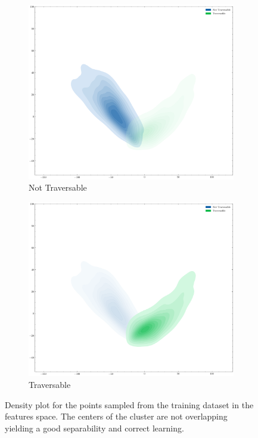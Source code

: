 \documentclass[../document.tex]{subfiles}
\begin{document}
\begin{figure} [htbp]
    \begin{subfigure}[b]{0.48\textwidth}
        \includegraphics[width=\linewidth]{../img/5/pca/pca-0-density.png}
        \caption{Not Traversable}
    \end{subfigure}
    \begin{subfigure}[b]{0.48\textwidth}
        \includegraphics[width=\linewidth]{../img/5/pca/pca-1-density.png}
        \caption{Traversable}
    \end{subfigure}
    \caption{Density plot for the points sampled from the training dataset in the features space. The centers of the cluster are not overlapping yielding a good separability and correct learning.}
    \end{figure}
\end{document}
